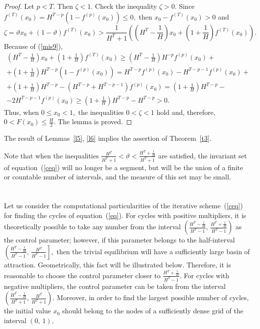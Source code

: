 \documentclass[12pt,a4paper]{amsart}
\begin{document}
\begin{proof}
Let $p<T.$ Then $\zeta < 1.$ Check the inequality $\zeta > 0.$ Since 
$f^{(T)}(x_0) = H^{T-p} \left(1 - f^{(p)}(x_0)\right) \leq 0,$ then $x_0 - f^{(T)}(x_0) > 0$ and
 $$
\zeta=\vartheta x_0 + (1-\vartheta)f^{(T)}(x_0) > 
\frac{1}{H^T + 1} \left ( \left(H^T - \frac{1}{H}\right)x_0 + \left(1 + \frac{1}{H}\right) f^{(T)}(x_0) \right).
$$
Because of (\ref{mis9}), 
\begin{gather*}
\left(H^T - \frac{1}{H}\right)x_0 + \left(1 + \frac{1}{H}\right) f^{(T)}(x_0) \geq 
\left(H^T - \frac{1}{H}\right) H^{-p} f^{(p)}(x_0) + \\
+ \left(1 + \frac{1}{H}\right) H^{T-p} \left(1- f^{(p)}(x_0)\right) = H^{T-p} f^{(p)}(x_0) - H^{T-p-1} f^{(p)}(x_0) +\\
+ \left(1 + \frac{1}{H}\right) H^{T-p} - \left(H^{T-p}+H^{T-p-1}\right)f^{(p)}(x_0) = \left(1 + \frac{1}{H}\right) H^{T-p} - \\
- 2 H^{T-p-1}f^{(p)}(x_0) \geq \left(1 + \frac{1}{H}\right) H^{T-p} - H^{T-p} >0.
\end{gather*}
Thus, when $0 \leq x_0 < 1,$ the inequalities $0<\zeta<1$ hold and, therefore, $0 < F(x_0) \leq \frac{H}{2}.$ 
The lemma is proved. 
\end{proof}

The result of Lemmas~\ref{l5}, \ref{l6} implies the assertion of Theorem~\ref{t3}.

Note that when the inequalities $\frac{H^T}{H^T+1}<\vartheta<\frac{H^T+\frac{1}{H}}{H^T+1}$ are satisfied,
the invariant set of equation~(\ref{ceq}) will no longer be a segment, but will be the union of a finite or countable 
number of intervals, and the measure of this set may be small.

\section{}

Let us consider the computational particularities of the iterative scheme~(\ref{ceq}) for finding the cycles of equation~(\ref{eq}).
For cycles with positive multipliers, it is theoretically possible to take any number from the interval 
$\left(\frac{H^T - \frac{1}{H}}{H^T-1},\,\frac{H^T + \frac{1}{H}}{H^T-1}\right)$ as the control parameter;
however, if this parameter belongs to the half-interval $\left(\frac{H^T - \frac{1}{H}}{H^T-1},\,\frac{H^T}{H^T-1}\right],$
then the trivial equilibrium will have a sufficiently large basin of attraction. Geometrically, this fact will be illustrated below. 
Therefore, it is reasonable to choose the control parameter closer to $\frac{H^T + \frac{1}{H}}{H^T-1}.$ For cycles with negative 
multipliers, the control parameter can be taken from the interval 
$\left(\frac{H^T - \frac{1}{H}}{H^T + 1},\,\frac{H^T}{H^T + 1}\right).$ Moreover, in order to find the largest possible 
number of cycles, the initial value $x_0$ should belong to the nodes of a sufficiently dense grid of the interval $(0,\,1).$
\end{document}
